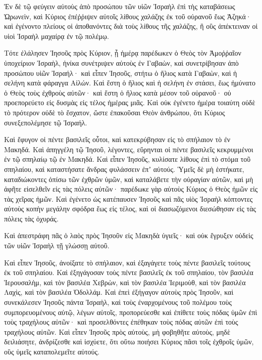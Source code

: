{Ἐν δὲ τῷ φεύγειν αὐτοὺς ἀπὸ προσώπου τῶν υἱῶν Ἰσραὴλ ἐπὶ τὴς καταβάσεως Ὡρωνεὶν, καὶ Κύριος ἐπέῤῥιψεν αὐτοῖς λίθους χαλάζης ἐκ τοῦ οὐρανοῦ ἕως Ἀζηκά· καὶ ἐγένοντο πλείους οἱ ἀποθανόντες διὰ τοὺς λίθους τῆς χαλάζης, ἢ οὓς ἀπέκτειναν οἱ υἱοὶ Ἰσραὴλ μαχαίρᾳ ἐν τῷ πολέμῳ.
\par }{\PP {}Τότε ἐλάλησεν Ἰησοῦς πρὸς Κύριον, ᾗ ἡμέρᾳ παρέδωκεν ὁ Θεὸς τὸν Ἀμοῤῥαῖον ὑποχείριον Ἰσραὴλ, ἡνίκα συνέτριψεν αὐτοὺς ἐν Γαβαὼν, καὶ συνετρίβησαν ἀπὸ προσώπου υἱῶν Ἰσραήλ· καὶ εἶπεν Ἰησοῦς, στήτω ὁ ἥλιος κατὰ Γαβαὼν, καὶ ἡ σελήνη κατὰ φάραγγα Αἰλών.
Καὶ ἔστη ὁ ἥλιος καὶ ἡ σελήνη ἐν στάσει, ἕως ἠμύνατο ὁ Θεὸς τοὺς ἐχθροὺς αὐτῶν· καὶ ἔστη ὁ ἥλιος κατὰ μέσον τοῦ οὐρανοῦ· οὐ προεπορεύετο εἰς δυσμὰς εἰς τέλος ἡμέρας μιᾶς.
Καὶ οὐκ ἐγένετο ἡμέρα τοιαύτη οὐδὲ τὸ πρότερον οὐδὲ τὸ ἔσχατον, ὥστε ἐπακοῦσαι Θεὸν ἀνθρώπου, ὅτι Κύριος συνεξεπολέμησε τῷ Ἰσραήλ.
\par }{\PP {}Καὶ ἔφυγον οἱ πέντε βασιλεῖς οὗτοι, καὶ κατεκρύβησαν εἰς τὸ σπήλαιον τὸ ἐν Μακηδά.
Καὶ ἀπηγγέλη τῷ Ἰησοῦ, λέγοντες, εὕρηνται οἱ πέντε βασιλεῖς κεκρυμμένοι ἐν τῷ σπηλαίῳ τῷ ἐν Μακηδά.
Καὶ εἶπεν Ἰησοῦς, κυλίσατε λίθους ἐπὶ τὸ στόμα τοῦ σπηλαίου, καὶ καταστήσατε ἄνδρας φυλάσσειν ἐπʼ αὐτούς.
Ὑμεῖς δὲ μὴ ἑστήκατε, καταδιώκοντες ὀπίσω τῶν ἐχθρῶν ὑμῶν, καὶ καταλάβετε τὴν οὐραγίαν αὐτῶν, καὶ μὴ ἀφῆτε εἰσελθεῖν εἰς τὰς πόλεις αὐτῶν· παρέδωκε γὰρ αὐτοὺς Κύριος ὁ Θεὸς ἡμῶν εἰς τὰς χεῖρας ἡμῶν.
Καὶ ἐγένετο ὡς κατέπαυσεν Ἰησοῦς καὶ πᾶς υἱὸς Ἰσραὴλ κόπτοντες αὐτοὺς κοπὴν μεγάλην σφόδρα ἕως εἰς τέλος, καὶ οἱ διασωζόμενοι διεσώθησαν εἰς τὰς πόλεις τὰς ὀχυράς.
\par }{\PP {}Καὶ ἀπεστράφη πᾶς ὁ λαὸς πρὸς Ἰησοῦν εἰς Μακηδὰ ὑγιεῖς· καὶ οὐκ ἔγρυξεν οὐδεὶς τῶν υἱῶν Ἰσραὴλ τῇ γλώσσῃ αὐτοῦ.
\par }{\PP {}Καὶ εἶπεν Ἰησοῦς, ἀνοίξατε τὸ σπήλαιον, καὶ ἐξαγάγετε τοὺς πέντε βασιλεῖς τούτους ἐκ τοῦ σπηλαίου.
Καὶ ἐξηγάγοσαν τοὺς πέντε βασιλεῖς ἐκ τοῦ σπηλαίου, τὸν βασιλέα Ἱερουσαλὴμ, καὶ τὸν βασιλέα Χεβρὼν, καὶ τὸν βασιλέα Ἱεριμοὺθ, καὶ τὸν βασιλέα Λαχὶς, καὶ τὸν βασιλέα Ὀδολλάμ.
Καὶ ἐπεὶ ἐξήγαγον αὐτοὺς πρὸς Ἰησοῦν, καὶ συνεκάλεσεν Ἰησοῦς πάντα Ἰσραὴλ, καὶ τοὺς ἐναρχομένους τοῦ πολέμου τοὺς συμπορευομένους αὐτῷ, λέγων αὐτοῖς, προπορεύεσθε καὶ ἐπίθετε τοὺς πόδας ὑμῶν ἐπὶ τοὺς τραχήλους αὐτῶν· καὶ προσελθόντες ἐπέθηκαν τοὺς πόδας αὐτῶν ἐπὶ τοὺς τραχήλους αὐτῶν.
Καὶ εἶπεν Ἰησοῦς πρὸς αὐτοὺς, μὴ φοβηθῆτε αὐτοὺς, μηδὲ δειλιάσητε, ἀνδρίζεσθε καὶ ἰσχύετε, ὅτι οὕτω ποιήσει Κύριος πᾶσι τοῖς ἐχθροῖς ὑμῶν, οὓς ὑμεῖς καταπολεμεῖτε αὐτούς.
}
